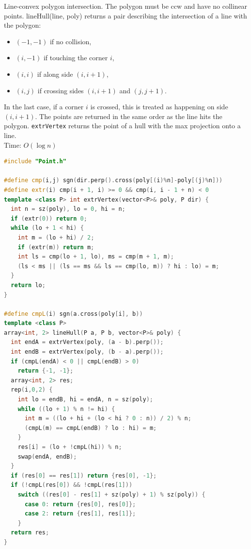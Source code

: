 Line-convex polygon intersection. The polygon must be ccw and have no collinear points.
lineHull(line, poly) returns a pair describing the intersection of a line with the polygon:
\begin{itemize}
\item $(-1, -1)$ if no collision,
\item $(i, -1)$ if touching the corner $i$,
\item $(i, i)$ if along side $(i, i+1)$,
\item $(i, j)$ if crossing sides $(i, i+1)$ and $(j, j+1)$.
\end{itemize}
In the last case, if a corner $i$ is crossed, this is treated as happening on side $(i, i+1)$.
The points are returned in the same order as the line hits the polygon.
\texttt{extrVertex} returns the point of a hull with the max projection onto a line.\\
Time: $O(\log n)$
\begin{lstlisting}[style=codebook, language=C++]
#include "Point.h"

#define cmp(i,j) sgn(dir.perp().cross(poly[(i)%n]-poly[(j)%n]))
#define extr(i) cmp(i + 1, i) >= 0 && cmp(i, i - 1 + n) < 0
template <class P> int extrVertex(vector<P>& poly, P dir) {
  int n = sz(poly), lo = 0, hi = n;
  if (extr(0)) return 0;
  while (lo + 1 < hi) {
    int m = (lo + hi) / 2;
    if (extr(m)) return m;
    int ls = cmp(lo + 1, lo), ms = cmp(m + 1, m);
    (ls < ms || (ls == ms && ls == cmp(lo, m)) ? hi : lo) = m;
  }
  return lo;
}

#define cmpL(i) sgn(a.cross(poly[i], b))
template <class P>
array<int, 2> lineHull(P a, P b, vector<P>& poly) {
  int endA = extrVertex(poly, (a - b).perp());
  int endB = extrVertex(poly, (b - a).perp());
  if (cmpL(endA) < 0 || cmpL(endB) > 0)
    return {-1, -1};
  array<int, 2> res;
  rep(i,0,2) {
    int lo = endB, hi = endA, n = sz(poly);
    while ((lo + 1) % n != hi) {
      int m = ((lo + hi + (lo < hi ? 0 : n)) / 2) % n;
      (cmpL(m) == cmpL(endB) ? lo : hi) = m;
    }
    res[i] = (lo + !cmpL(hi)) % n;
    swap(endA, endB);
  }
  if (res[0] == res[1]) return {res[0], -1};
  if (!cmpL(res[0]) && !cmpL(res[1]))
    switch ((res[0] - res[1] + sz(poly) + 1) % sz(poly)) {
      case 0: return {res[0], res[0]};
      case 2: return {res[1], res[1]};
    }
  return res;
}
\end{lstlisting}
